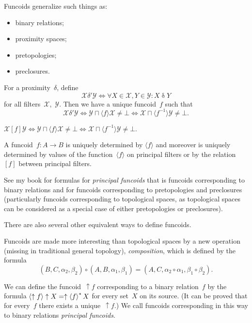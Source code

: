 \documentclass{amsart}
\begin{document}
Funcoids generalize such things as:
\begin{itemize}
\item binary relations;
\item proximity spaces;
\item pretopologies;
\item preclosures.
\end{itemize}

For a proximity~$\delta$, define
\[ \mathcal{X}\mathrel{\delta'}\mathcal{Y} \Leftrightarrow \forall X\in\mathcal{X},Y\in\mathcal{Y}: X\mathrel{\delta}Y \]
for all filters~$\mathcal{X}$,~$\mathcal{Y}$.
Then we have a unique funcoid~$f$ such that
\[
\mathcal{X}\mathrel{\delta'}\mathcal{Y} \Leftrightarrow
\mathcal{Y}\sqcap\langle f\rangle\mathcal{X} \ne \bot \Leftrightarrow
\mathcal{X}\sqcap\langle f^{-1}\rangle\mathcal{Y} \ne \bot.
\]

\begin{defn}
$\mathcal{X} \mathrel{[f]} \mathcal{Y} \Leftrightarrow \mathcal{Y}\sqcap\langle f\rangle\mathcal{X} \ne \bot \Leftrightarrow
\mathcal{X}\sqcap\langle f^{-1}\rangle\mathcal{Y} \ne \bot$.
\end{defn}

\begin{prop}
A funcoid~$f: A\rightarrow B$ is uniquely determined by $\langle f\rangle$ and moreover is uniquely
determined by values of the function~$\langle f\rangle$ on principal filters or
by the relation~$[f]$ between principal filters.
\end{prop}

See my book for formulas for \emph{principal funcoids} that is funcoids corresponding to binary relations
and for funcoids corresponding to pretopologies and preclosures (particularly funcoids corresponding to
topological spaces, as topological spaces can be considered as a special case of either pretopologies or preclosures).

There are also several other equivalent ways to define funcoids.

Funcoids are made more interesting than topological spaces by a new operation (missing in traditional general topology),
\emph{composition}, which is defined by the formula
\[ (B,C,\alpha_2,\beta_2)\circ (A,B,\alpha_1,\beta_1) = (A,C,\alpha_2\circ\alpha_1,\beta_1\circ\beta_2). \]

We can define the funcoid~$\uparrow f$ corresponding to a binary relation~$f$ by the formula $\left\langle \uparrow f\right\rangle\uparrow X=\uparrow\left\langle f\right\rangle ^{\ast}X$ for every set~$X$ on its source. (It can be proved that for every~$f$ there exists a unique~$\uparrow f$.) We call funcoids corresponding in this way to binary relations \emph{principal funcoids}.
\end{document}
